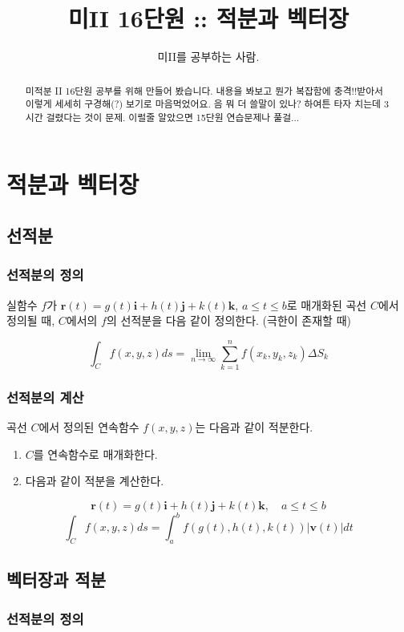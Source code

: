 \documentclass[chapter, oneside]{oblivoir}
\title{미II 16단원 :: 적분과 벡터장}
\author{미II를 공부하는 사람. }
\begin{document}
\maketitle
\begin{abstract}
미적분 II 16단원 공부를 위해 만들어 봤습니다. 내용을 봐보고 뭔가 복잡함에 충격!!받아서 이렇게 세세히 구경해(?) 보기로 마음먹었어요. 음 뭐 더 쓸말이 있나? 하여튼 타자 치는데 3시간 걸렸다는 것이 문제. 이럴줄 알았으면 15단원 연습문제나 풀걸...
\end{abstract}

\newpage
\tableofcontents

\setcounter{chapter}{15}
\chapter{적분과 벡터장  }
\section{선적분 }
\subsection{선적분의 정의 }
실함수 $f$가 $\textbf{r}(t) = g(t)\textbf{i} +h(t) \textbf{j} + k(t)\textbf{k}$, $a \le t \le b$로 매개화된 곡선 $C$에서 정의될 때, $C$에서의 $f$의 선적분을 다음 같이 정의한다.
(극한이 존재할 때)

$$ \int_{C} f(x,y,z) ds = \lim_{n \to \infty} \sum_{k=1}^{n} f(x_k , y_k , z_k ) \Delta S_k $$

\subsection{선적분의 계산 }

곡선 $C$에서 정의된 연속함수 $f(x,y,z)$는 다음과 같이 적분한다.
\begin{enumerate}
\item $C$를 연속함수로 매개화한다. 
\item 다음과 같이 적분을 계산한다.
\end{enumerate}

$$ \textbf{r}(t) = g(t)\textbf{i} +h(t) \textbf{j} + k(t)\textbf{k}, \quad a \le t \le b $$
$$ \int_C f(x,y,z) ds = \int_a^b f(g(t),h(t), k(t)) \left|\textbf{v}(t)\right| dt$$


\section{벡터장과 적분}
\subsection{선적분의 정의 }
\end{document}
